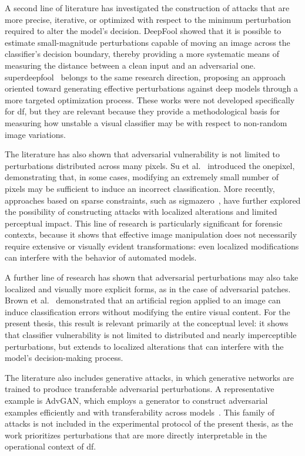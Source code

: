 A second line of literature has investigated the construction of attacks that
are more precise, iterative, or optimized with respect to the minimum
perturbation required to alter the model's decision. DeepFool
\cite{moosavi2016deepfool} showed that it is possible to estimate
small-magnitude perturbations capable of moving an image across the
classifier's decision boundary, thereby providing a more systematic means of
measuring the distance between a clean input and an adversarial one.
\gls{superdeepfool}~\cite{zhang2024superdeepfool} belongs to the same research
direction, proposing an approach oriented toward generating effective
perturbations against deep models through a more targeted optimization process.
These works were not developed specifically for \gls{df}, but they are relevant
because they provide a methodological basis for measuring how unstable a visual
classifier may be with respect to non-random image variations.

The literature has also shown that adversarial vulnerability is not limited to
perturbations distributed across many pixels. Su et al.~\cite{su2019onepixel}
introduced the \gls{onepixel}, demonstrating that, in some cases, modifying an
extremely small number of pixels may be sufficient to induce an incorrect
classification. More recently, approaches based on sparse constraints, such as
\gls{sigmazero}~\cite{zhao2024sigmazero}, have further explored the possibility
of constructing attacks with localized alterations and limited perceptual
impact. This line of research is particularly significant for forensic
contexts, because it shows that effective image manipulation does not
necessarily require extensive or visually evident transformations: even
localized modifications can interfere with the behavior of automated models.

A further line of research has shown that adversarial perturbations may also
take localized and visually more explicit forms, as in the case of adversarial
patches. Brown et al.~\cite{brown2017patch} demonstrated that an artificial
region applied to an image can induce classification errors without modifying
the entire visual content. For the present thesis, this result is relevant
primarily at the conceptual level: it shows that classifier vulnerability is
not limited to distributed and nearly imperceptible perturbations, but extends
to localized alterations that can interfere with the model's decision-making
process.

The literature also includes generative attacks, in which generative networks
are trained to produce transferable adversarial perturbations. A representative
example is AdvGAN, which employs a generator to construct adversarial examples
efficiently and with transferability across models~\cite{xia2018advgan}. This
family of attacks is not included in the experimental protocol of the present
thesis, as the work prioritizes perturbations that are more directly
interpretable in the operational context of \gls{df}.

